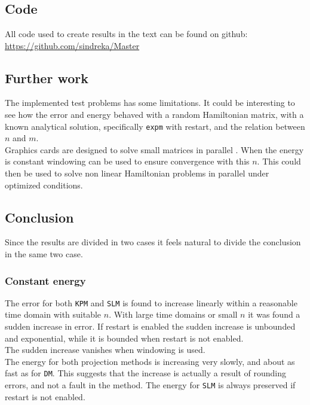 \chapter{  }
\section{Code}
All code used to create results in the text can be found on github: \\
\url{https://github.com/sindreka/Master}
\section{Further work}
The implemented test problems has some limitations. It could be interesting to see how the error and energy behaved with a random Hamiltonian matrix, with a known analytical solution, specifically \texttt{expm} with restart, and the relation between $n$ and $m$. \\

\noindent Graphics cards are designed to solve small matrices in parallel \cite{graphics}. When the energy is constant windowing can be used to ensure convergence with this $n$. This could then be used to solve non linear Hamiltonian problems in parallel under optimized conditions. \\

\section{Conclusion}

Since the results are divided in two cases it feels natural to divide the conclusion in the same two case.
\subsection{Constant energy} %
The error for both \texttt{KPM} and \texttt{SLM} is found to increase linearly within a reasonable time domain with suitable $n$. With large time domains or small $n$ it was found a sudden increase in error. If restart is enabled the sudden increase is unbounded and exponential, while it is bounded when restart is not enabled.\\
The sudden increase vanishes when windowing is used. \\

\noindent The energy for both projection methods is increasing very slowly, and about as fast as for \texttt{DM}. This suggests that the increase is actually a result of rounding errors, and not a fault in the method. The energy for \texttt{SLM} is always preserved if restart is not enabled. \\

